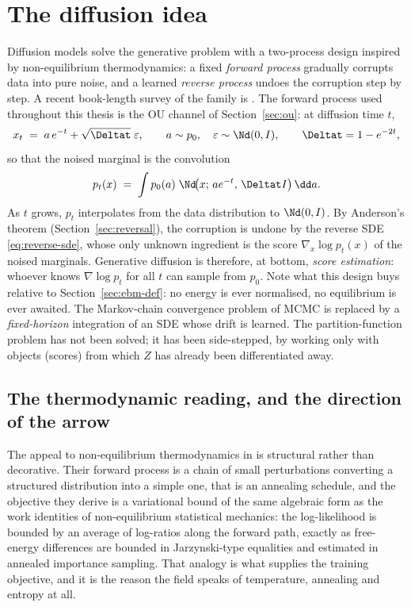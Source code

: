 \section{The diffusion idea}\label{sec:diffusion-idea}

Diffusion models \citep{sohl2015deep, ho2020denoising,
song2021scorebased} solve the generative problem with a two-process
design inspired by non-equilibrium thermodynamics: a fixed \emph{forward
process} gradually corrupts data into pure noise, and a learned
\emph{reverse process} undoes the corruption step by step. A recent
book-length survey of the family is \citet{lai2025principles}. The
forward process used throughout this thesis is the OU channel of
Section~\ref{sec:ou}: at diffusion time $t$,
\begin{equation}
  x_t \;=\; a\, e^{-t} + \sqrt{\Deltat}\;\varepsilon,
  \qquad a \sim p_0,\quad \varepsilon \sim \Nd(0, I),
  \qquad \Deltat = 1 - e^{-2t},
  \label{eq:forward-marginal}
\end{equation}
so that the noised marginal is the convolution
\begin{equation}
  p_t(x) \;=\; \int p_0(a)\; \Nd\!\big(x;\, a e^{-t},\, \Deltat I\big)\,
  \dd a .
  \label{eq:pt-convolution}
\end{equation}
As $t$ grows, $p_t$ interpolates from the data distribution to
$\Nd(0, I)$. By Anderson's theorem (Section~\ref{sec:reversal}), the
corruption is undone by the reverse SDE \eqref{eq:reverse-sde}, whose
only unknown ingredient is the score $\nabla_x \log p_t(x)$ of the noised
marginals. Generative diffusion is therefore, at bottom, \emph{score
estimation}: whoever knows $\nabla \log p_t$ for all $t$ can sample from
$p_0$. Note what this design buys relative to
Section~\ref{sec:ebm-def}: no energy is ever normalised, no equilibrium
is ever awaited. The Markov-chain convergence problem of MCMC is replaced
by a \emph{fixed-horizon} integration of an SDE whose drift is learned.
The partition-function problem has not been solved; it has been
side-stepped, by working only with objects (scores) from which $Z$ has
already been differentiated away.

\subsection{The thermodynamic reading, and the direction of the arrow}
\label{sec:diffusion-thermo}

The appeal to non-equilibrium thermodynamics in \citet{sohl2015deep} is
structural rather than decorative. Their forward process is a chain of small
perturbations converting a structured distribution into a simple one, that is
an annealing schedule, and the objective they derive is a variational bound of
the same algebraic form as the work identities of non-equilibrium statistical
mechanics: the log-likelihood is bounded by an average of log-ratios along the
forward path, exactly as free-energy differences are bounded in Jarzynski-type
equalities and estimated in annealed importance sampling. That analogy is what
supplies the training objective, and it is the reason the field speaks of
temperature, annealing and entropy at all.

